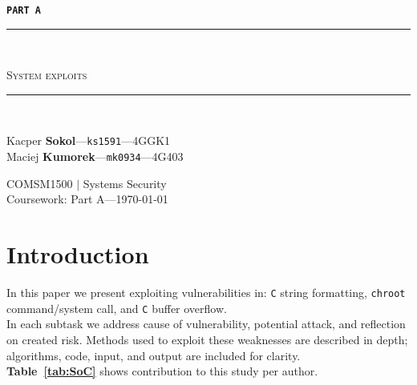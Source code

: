 \documentclass[12pt, a4paper, pdflatex]{article}
\newcommand{\HRule}{\rule{\linewidth}{0.5mm}}
\begin{document}

\begin{center}
\vspace*{\fill}
  \Huge
 \texttt{\textbf{PART A}}
 \vspace*{\fill}
\end{center}
\newpage

\begin{center}
    \begin{large}
    {\HRule \\[0.2cm]}
    \textsc{System exploits}
    {\HRule \\[0.3cm]}
    \end{large}

    \begin{minipage}{ 0.49\textwidth }
        \begin{flushleft}
            Kacper \textbf{Sokol}---\texttt{ks1591}---4GGK1\\
            Maciej \textbf{Kumorek}---\texttt{mk0934}---4G403\\
        \end{flushleft}
    \end{minipage}
    \begin{minipage}{ 0.49\textwidth }
        \begin{flushright}
            {COMSM1500 $|$ Systems Security\\
            Coursework: Part A---\today\\[0.3cm]}
        \end{flushright}
    \end{minipage}
\end{center}

\section{Introduction}
In this paper we present exploiting vulnerabilities in: \texttt{C} string formatting, \texttt{chroot} command/system call, and \texttt{C} buffer overflow.\\
In each subtask we address cause of vulnerability, potential attack, and reflection on created risk. Methods used to exploit these weaknesses are described in depth; algorithms, code, input, and output are included for clarity.\\
\textbf{Table~\ref{tab:SoC}} shows contribution to this study per author.
\end{document}
